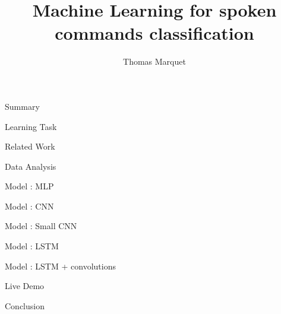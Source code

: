\documentclass{beamer}
\title{Machine Learning for spoken commands classification}
\author{Thomas Marquet}
\begin{document}
	
	\begin{frame}
		\titlepage
	\end{frame}
	
	\begin{frame}{Summary}
		\tableofcontents[]
	\end{frame}	
	

	\begin{frame}{Learning Task} 

	\end{frame}

	\begin{frame}{Related Work} 

	\end{frame}
	
	\begin{frame}{Data Analysis} 

	\end{frame}
	
	\begin{frame}{Model : MLP}

	\end{frame}

	\begin{frame}{Model : CNN}

	\end{frame}
	\begin{frame}{Model : Small CNN}

	\end{frame}	
	
	\begin{frame}{Model : LSTM}

	\end{frame}	
	
	\begin{frame}{Model : LSTM + convolutions}

	\end{frame}

	\begin{frame}{Live Demo}

	\end{frame}	
	
	\begin{frame}{Conclusion}

	\end{frame}		
\end{document}
